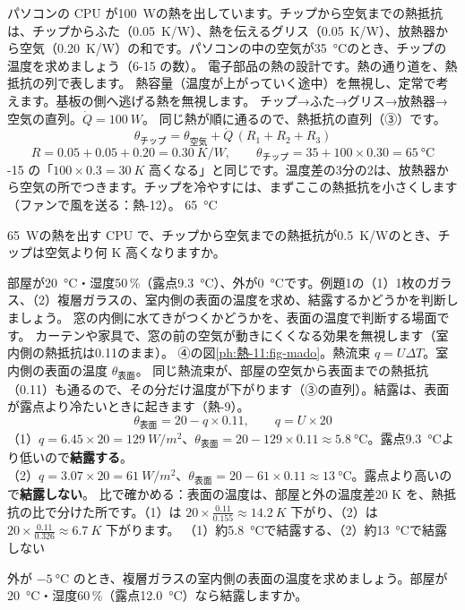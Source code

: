 \label{ph:熱-11:ex10}
\begin{phreidai}
パソコンの CPU が\qty{100}{W}の熱を出しています。チップから空気までの熱抵抗は、チップからふた（\qty{0.05}{K/W}）、熱を伝えるグリス（\qty{0.05}{K/W}）、放熱器から空気（\qty{0.20}{K/W}）の和です。パソコンの中の空気が\qty{35}{\celsius}のとき、チップの温度を求めましょう（6-15 の数）。
\phbamen
電子部品の熱の設計です。熱の通り道を、熱抵抗の列で表します。
\phmushi
熱容量（温度が上がっていく途中）を無視し、定常で考えます。基板の側へ逃げる熱を無視します。
\phzu
チップ→ふた→グリス→放熱器→空気の直列。$\dot Q=\qty{100}{W}$。
\phriyu
同じ熱が順に通るので、熱抵抗の直列（③）です。
\phtateru
\[\theta_{\text{チップ}}=\theta_{\text{空気}}+\dot Q\,(R_1+R_2+R_3)\]
\phtoku
\[R=0.05+0.05+0.20=\qty{0.30}{K/W},\qquad\theta_{\text{チップ}}=35+100\times0.30=\qty{65}{\celsius}\]
-15 の「$100\times0.3=\qty{30}{K}$ 高くなる」と同じです。温度差の3分の2は、放熱器から空気の所でつきます。チップを冷やすには、まずここの熱抵抗を小さくします（ファンで風を送る：熱-12）。
\kotae \qty{65}{\celsius}
\end{phreidai}
\begin{jibun}
\qty{65}{W}の熱を出す CPU で、チップから空気までの熱抵抗が\qty{0.5}{K/W}のとき、チップは空気より何 K 高くなりますか。
\end{jibun}

\label{ph:熱-11:ex11}
\begin{phreidai}[窓は結露するか]
部屋が\qty{20}{\celsius}・湿度50\,\%（露点\qty{9.3}{\celsius}）、外が\qty{0}{\celsius}です。例題1の（1）1枚のガラス、（2）複層ガラスの、室内側の表面の温度を求め、結露するかどうかを判断しましょう。
\phbamen
窓の内側に水てきがつくかどうかを、表面の温度で判断する場面です。
\phmushi
カーテンや家具で、窓の前の空気が動きにくくなる効果を無視します（室内側の熱抵抗は0.11のまま）。
\phzu
④の図\ref{ph:熱-11:fig-mado}。熱流束 $q=U\Delta T$。室内側の表面の温度 $\theta_{\text{表面}}$。
\phriyu
同じ熱流束が、部屋の空気から表面までの熱抵抗（0.11）も通るので、その分だけ温度が下がります（③の直列）。結露は、表面が露点より冷たいときに起きます（熱-9）。
\phtateru
\[\theta_{\text{表面}}=20-q\times0.11,\qquad q=U\times20\]
\phtoku
（1）$q=6.45\times20=\qty{129}{W/m^2}$、$\theta_{\text{表面}}=20-129\times0.11\approx\qty{5.8}{\celsius}$。露点\qty{9.3}{\celsius}より低いので\textbf{結露する}。\\
（2）$q=3.07\times20=\qty{61}{W/m^2}$、$\theta_{\text{表面}}=20-61\times0.11\approx\qty{13}{\celsius}$。露点より高いので\textbf{結露しない}。
\phtashikame
比で確かめる：表面の温度は、部屋と外の温度差20 K を、熱抵抗の比で分けた所です。（1）は $20\times\tfrac{0.11}{0.155}\approx\qty{14.2}{K}$ 下がり、（2）は $20\times\tfrac{0.11}{0.326}\approx\qty{6.7}{K}$ 下がります。
\kotae （1）約\qty{5.8}{\celsius}で結露する、（2）約\qty{13}{\celsius}で結露しない
\end{phreidai}
\begin{jibun}
外が $\qty{-5}{\celsius}$ のとき、複層ガラスの室内側の表面の温度を求めましょう。部屋が\qty{20}{\celsius}・湿度60\,\%（露点\qty{12.0}{\celsius}）なら結露しますか。
\end{jibun}

